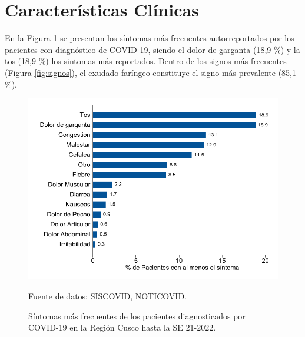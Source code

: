 \documentclass[12pt,a4paper,openany]{book}
\begin{document}
	
	
	\cleardoublepage
	
	
	\clearpage

	
	\section*{Características Clínicas}
	\noindent En la Figura \ref{fig:sintomas} se presentan los síntomas más frecuentes autorreportados por los pacientes con diagnóstico de COVID-19, siendo el dolor de garganta (18,9 $\%$) y la tos (18,9 $\%$) los sintomas más reportados. Dentro de los signos más frecuentes (Figura \ref{fig:signos}), el exudado faríngeo constituye el signo más prevalente (85,1 $\%$). 
	 
	
	\begin{figure}[h]
		\caption{Síntomas más frecuentes de los pacientes diagnosticados por COVID-19 en la Región Cusco hasta la SE 21-2022.  }\label{fig:sintomas}
		\begin{center}
			\includegraphics[width=0.85\linewidth]{../figuras/figura_sintoma.pdf}
		\end{center}
		{\footnotesize {Fuente de datos: SISCOVID, NOTICOVID.}}
	\end{figure}
	
\end{document}
